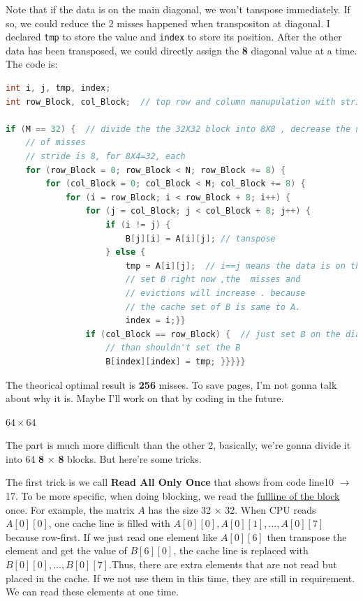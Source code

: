 \documentclass{article}
\begin{document}
Note that if the data is on the main diagonal, we won't tanspose immediately. If so, we could reduce the 2 misses happened when transpositon at diagonal. I declared \lstinline|tmp| to store the value and \lstinline|index| to store its position. After the other data has been transposed, we could directly assign the \textbf{8} diagonal value at a time. The code is:
\begin{lstlisting}[language=c]
int i, j, tmp, index;
int row_Block, col_Block;  // top row and column manupulation with stride
	
if (M == 32) {  // divide the the 32X32 block into 8X8 , decrease the number
	// of misses
	// stride is 8, for 8X4=32, each 
	for (row_Block = 0; row_Block < N; row_Block += 8) {
		for (col_Block = 0; col_Block < M; col_Block += 8) {
			for (i = row_Block; i < row_Block + 8; i++) {
				for (j = col_Block; j < col_Block + 8; j++) {
					if (i != j) {
						B[j][i] = A[i][j]; // tanspose 
					} else {
						tmp = A[i][j];  // i==j means the data is on the diagonal. if we
						// set B right now ,the  misses and
						// evictions will increase . because
						// the cache set of B is same to A.
						index = i;}}
				if (col_Block == row_Block) {  // just set B on the diagonal. other
					// than shouldn't set the B
					B[index][index] = tmp; }}}}}
\end{lstlisting}

The theorical optimal result is \textbf{256} misses. To save pages, I'm not gonna talk about why it is. Maybe I'll work on that by coding in the future.

{\color{blue} $ 64 \times 64 $}

The part is much more difficult than the other 2, basically, we're gonna divide it into 64 \textbf{8} $\times$ \textbf{8} blocks. But here're some tricks. 

The first trick is we call \textbf{Read All Only Once} that shows from code line10 $\rightarrow$ 17. To be more specific, when doing blocking, {we read the \underline{fullline of the block} once}. For example, the matrix $ A $ has the size 32 $\times$ 32. When CPU reads $ A[0][0] $, one cache line is filled with $ A[0][0],A[0][1], ...,A[0][7] $ because row-first. If we just read one element like $ A[0][6] $ then transpose the element and get the value of $ B[6][0] $, the cache line is replaced with $ B[0][0], ...,B[0][7]. $Thus, there are extra elements that are not read but placed in the cache. If we not use them in this time, they are still in requirement. We can read these elements at one time.
\end{document}
